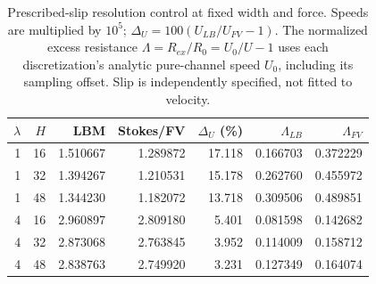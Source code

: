 \begin{table}[htbp]\centering\small
\caption{Prescribed-slip resolution control at fixed width and force. Speeds are multiplied by $10^5$; $\Delta_U=100(U_{LB}/U_{FV}-1)$. The normalized excess resistance $\Lambda=R_{ex}/R_0=U_0/U-1$ uses each discretization's analytic pure-channel speed $U_0$, including its sampling offset. Slip is independently specified, not fitted to velocity.}\label{tab:slipresolution}
\begin{tabular}{rrrrrrr}\toprule
$\lambda$ & $H$ & LBM & Stokes/FV & $\Delta_U$ (\%) & $\Lambda_{LB}$ & $\Lambda_{FV}$ \\ \midrule
1 & 16 & 1.510667 & 1.289872 & 17.118 & 0.166703 & 0.372229 \\
1 & 32 & 1.394267 & 1.210531 & 15.178 & 0.262760 & 0.455972 \\
1 & 48 & 1.344230 & 1.182072 & 13.718 & 0.309506 & 0.489851 \\
4 & 16 & 2.960897 & 2.809180 & 5.401 & 0.081598 & 0.142682 \\
4 & 32 & 2.873068 & 2.763845 & 3.952 & 0.114009 & 0.158712 \\
4 & 48 & 2.838763 & 2.749920 & 3.231 & 0.127349 & 0.164074 \\
\bottomrule\end{tabular}\end{table}
